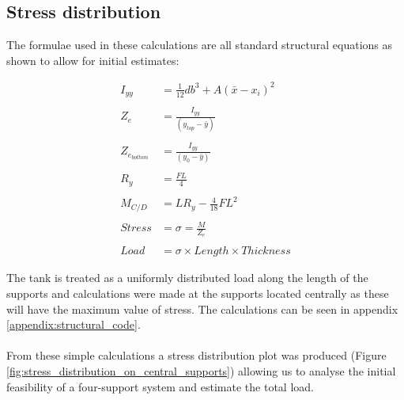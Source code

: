 \subsection{Stress distribution}
The formulae used in these calculations are all standard structural equations as shown to allow for initial estimates: 

\begin{equation}
\begin{split}
  I_{yy} & = \frac{1}{12} d b^{3} + A(\bar{x} - x_{i})^{2} \\ \\
  Z_{e} & = \frac{I_{yy}}{(y_{top} - \bar{y})} \\ \\
  Z_{e_{bottom}} & = \frac{I_{yy}}{(y_{0} - \bar{y})} \\ \\
  R_{y} & = \frac{FL}{4} \\ \\ 
  M_{C/D} & = L R_{y} - \frac{4}{18} FL^{2} \\ \\
  Stress & = \sigma = \frac{M}{Z_{e}} \\ \\
  Load & = \sigma \times Length \times Thickness
\end{split}
\label{eqn:cog_formula}
\end{equation}

The tank is treated as a uniformly distributed load along the length of the supports and calculations were made at the supports located centrally as these will have the maximum value of stress. The calculations can be seen in appendix \ref{appendix:structural_code}.
\\ \\ 

From these simple calculations a stress distribution plot was produced (Figure \ref{fig:stress_distribution_on_central_supports}) allowing us to analyse the initial feasibility of a four-support system and estimate the total load. 

